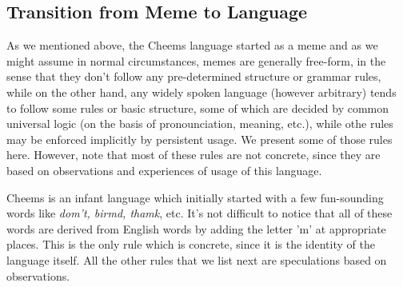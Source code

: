 \def\DevnagVersion{2.17}\documentclass{article}
\begin{document}
\subsection{Transition from Meme to Language}
As we mentioned above, the Cheems language started as a meme and as we might assume in normal circumstances, memes are generally free-form, in the sense that they don't follow any pre-determined structure or grammar rules, while on the other hand, any widely spoken language (however arbitrary) tends to follow some rules or basic structure, some of which are decided by common universal logic (on the basis of pronounciation, meaning, etc.), while othe rules may be enforced implicitly by persistent usage. We present some of those rules here. However, note that most of these rules are not concrete, since they are based on observations and experiences of usage of this language.\par
Cheems is an infant language which initially started with a few fun-sounding words like \textit{dom't, birmd, thamk}, etc. It's not difficult to notice that all of these words are derived from English words by adding the letter 'm' at appropriate places. This is the only rule which is concrete, since it is the identity of the language itself. All the other rules that we list next are speculations based on observations.
\end{document}
